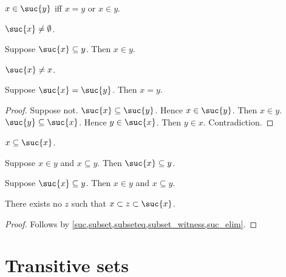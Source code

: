 \begin{proposition}\label{suc_iff}
    $x\in\suc{y}$ iff $x = y$ or $x\in y$.
\end{proposition}

\begin{proposition}\label{suc_neq_emptyset}
    $\suc{x}\neq \emptyset$.
\end{proposition}

\begin{proposition}\label{suc_subseteq_implies_in}
    Suppose $\suc{x}\subseteq y$. Then $x\in y$.
\end{proposition}

\begin{proposition}\label{suc_neq_self}
    $\suc{x}\neq x$.
\end{proposition}

\begin{proposition}\label{suc_injective}
    Suppose $\suc{x} = \suc{y}$. Then $x = y$.
\end{proposition}
\begin{proof}
    Suppose not.
    $\suc{x}\subseteq \suc{y}$. Hence $x\in\suc{y}$.
    Then $x\in y$.
    $\suc{y}\subseteq \suc{x}$. Hence $y\in\suc{x}$.
    Then $y\in x$.
    Contradiction.
\end{proof}

\begin{proposition}\label{subseteq_self_suc_intro}
    $x\subseteq\suc{x}$.
\end{proposition}

\begin{proposition}\label{suc_subseteq_intro}
    Suppose $x\in y$ and $x\subseteq y$.
    Then $\suc{x}\subseteq y$.
\end{proposition}

\begin{proposition}\label{suc_subseteq_elim}
    Suppose $\suc{x}\subseteq y$.
    Then $x\in y$ and $x\subseteq y$.
\end{proposition}

\begin{proposition}\label{suc_next_subset}
    There exists no $z$ such that $x\subset z\subset \suc{x}$.
\end{proposition}
\begin{proof}
    Follows by \cref{suc,subset,subseteq,subset_witness,suc_elim}.
\end{proof}

\section{Transitive sets}

